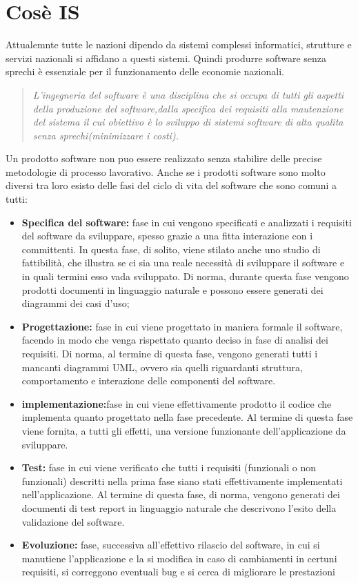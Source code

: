 \documentclass[a4paper,11pt]{book}
\begin{document}
		\section{Cosè IS}
		Attualemnte tutte le nazioni dipendo da sistemi complessi informatici, strutture e servizi nazionali si affidano a questi sistemi.
		Quindi produrre software senza sprechi è essenziale per il funzionamento delle economie nazionali.
		\begin{quotation}
			\textit{L'ingegneria del software è una disciplina che si occupa di tutti gli aspetti della produzione del software,dalla specifica dei requisiti alla mautenzione del sistema il cui obiettivo è lo sviluppo di sistemi software di alta qualita senza sprechi(minimizzare i costi).}
		\end{quotation}
		Un prodotto software non puo essere realizzato senza stabilire delle precise metodologie di processo lavorativo. Anche se i prodotti software sono molto diversi tra loro esisto delle fasi del ciclo di vita del software che sono comuni a tutti: 
		\begin{itemize}
			\item \textbf{Specifica del software:} fase in cui vengono specificati e analizzati i requisiti del software da sviluppare, spesso grazie a una fitta interazione con i committenti. In questa fase, di solito, viene stilato anche uno studio di fattibilità, che illustra se ci sia una reale necessità di sviluppare il software e in quali termini esso vada sviluppato. Di norma, durante questa fase vengono prodotti documenti in linguaggio naturale e possono essere generati dei diagrammi dei casi d'uso;
			
			\item \textbf{Progettazione:} fase in cui viene progettato in maniera formale il software, facendo in modo che venga rispettato quanto deciso in fase di analisi dei requisiti. Di norma, al termine di questa fase, vengono generati tutti i mancanti diagrammi UML, ovvero sia quelli riguardanti struttura, comportamento e interazione delle componenti del software.
			\item \textbf{implementazione:}fase in cui viene effettivamente prodotto il codice che implementa quanto progettato nella fase precedente. Al termine di questa fase viene fornita, a tutti gli effetti, una versione funzionante dell’applicazione da sviluppare.
			\item \textbf{Test:} fase in cui viene verificato che tutti i requisiti (funzionali o non funzionali) descritti nella prima fase siano stati effettivamente implementati nell’applicazione. Al termine di questa fase, di norma, vengono generati dei documenti di test report in linguaggio naturale che descrivono l’esito della validazione del software.
			\item \textbf{Evoluzione:} fase, successiva all’effettivo rilascio del software, in cui si manutiene l’applicazione e la si modifica in caso di cambiamenti in certuni requisiti, si correggono eventuali bug e si cerca di migliorare le prestazioni
		\end{itemize}
		
\end{document}

